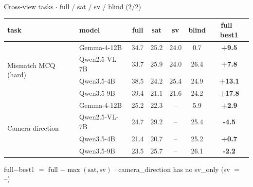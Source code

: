 \documentclass[aspectratio=169]{beamer}
\begin{document}
\begin{frame}{Cross-view tasks \textbf{$\cdot$} full / sat / sv / blind (2/2)}
\centering\scriptsize
\begin{tabular}{llcccc>{\bfseries}c}
\toprule
task & model & full & sat & sv & blind & full$-$best1 \\
\midrule
\multirow{4}{*}{Mismatch MCQ (hard)} & Gemma-4-12B & 34.7 & 25.2 & 24.0 & 0.7 & \textcolor{good}{+9.5} \\
 & Qwen2.5-VL-7B & 33.7 & 25.9 & 24.0 & 26.4 & \textcolor{good}{+7.8} \\
 & Qwen3.5-4B & 38.5 & 24.2 & 25.4 & 24.9 & \textcolor{good}{+13.1} \\
 & Qwen3.5-9B & 39.4 & 21.1 & 21.6 & 24.2 & \textcolor{good}{+17.8} \\
\midrule
\multirow{4}{*}{Camera direction} & Gemma-4-12B & 25.2 & 22.3 & -- & 5.9 & +2.9 \\
 & Qwen2.5-VL-7B & 24.7 & 29.2 & -- & 25.4 & \textcolor{bad}{-4.5} \\
 & Qwen3.5-4B & 21.4 & 20.7 & -- & 25.2 & +0.7 \\
 & Qwen3.5-9B & 23.5 & 25.7 & -- & 26.1 & \textcolor{bad}{-2.2} \\
\bottomrule
\end{tabular}
\vspace{2pt}\par\tiny full$-$best1 $=$ full $-\max(\text{sat},\text{sv})$ \textbf{$\cdot$} camera\_direction has no sv\_only (sv $=$ --)
\end{frame}
\end{document}
